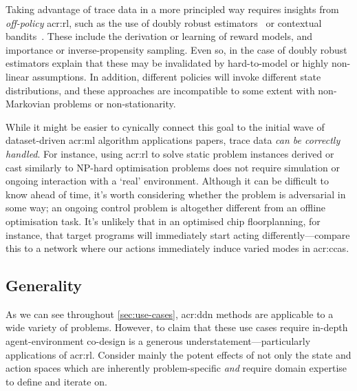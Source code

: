 Taking advantage of trace data in a more principled way requires insights from \emph{off-policy} \gls{acr:rl}, such as the use of doubly robust estimators~\parencite{DBLP:conf/hotnets/BartulovicJBSS17} or contextual bandits~\parencite{DBLP:conf/hotnets/LecuyerLNSSS17}.
These include the derivation or learning of reward models, and importance or inverse-propensity sampling.
Even so, in the case of doubly robust estimators \citeauthor{DBLP:conf/hotnets/BartulovicJBSS17} explain that these may be invalidated by hard-to-model or highly non-linear assumptions.
In addition, different policies will invoke different state distributions, and these approaches are incompatible to some extent with non-Markovian problems or non-stationarity.

While it might be easier to cynically connect this goal to the initial wave of dataset-driven \gls{acr:ml} algorithm applications papers, trace data \emph{can be correctly handled}.
For instance, using \gls{acr:rl} to solve static problem instances derived or cast similarly to \textsf{NP}-hard optimisation problems does not require simulation or ongoing interaction with a `real' environment.
Although it can be difficult to know ahead of time, it's worth considering whether the problem is adversarial in some way; an ongoing control problem is altogether different from an offline optimisation task.
It's unlikely that in an optimised chip floorplanning, for instance, that target programs will immediately start acting differently---compare this to a network where our actions immediately induce varied modes in \glspl{acr:cca}.

\subsection{Generality}
As we can see throughout \cref{sec:use-cases}, \gls{acr:ddn} methods are applicable to a wide variety of problems.
However, to claim that these use cases require in-depth agent-environment co-design is a generous understatement---particularly applications of \gls{acr:rl}.
Consider mainly the potent effects of not only the state and action spaces which are inherently problem-specific \emph{and} require domain expertise to define and iterate on.

